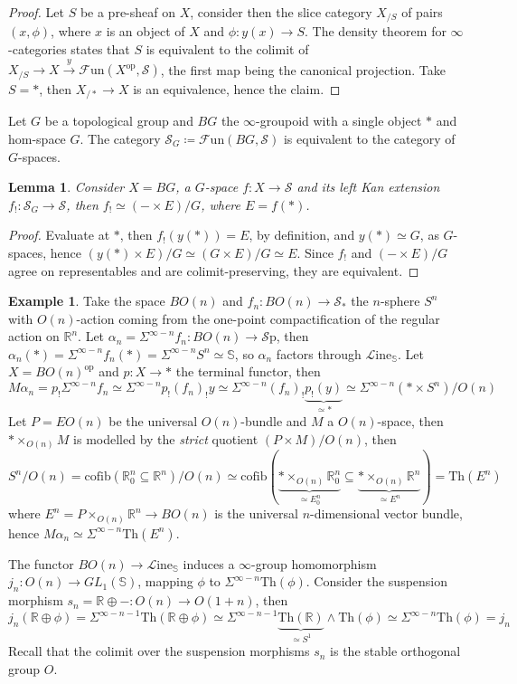 \documentclass[a4paper]{book}
\newcommand{\lF}{\mathcal{F}}
\newcommand{\lL}{\mathcal{L}}
\newcommand{\bR}{\mathbb{R}}
\newcommand{\lS}{\mathcal{S}}
\newcommand{\bS}{\mathbb{S}}
\newcommand{\op}{\mathrm{op}}
\newcommand{\Fun}{\lF\mathrm{un}} %
\newcommand{\Sp}{\lS\mathrm{p}} %
\renewcommand{\Line}{\lL\mathrm{ine}} %
\newtheorem{lemma}[equation]{Lemma}
\theoremstyle{definition}
\newtheorem{example}[equation]{Example}
\theoremstyle{remark}
\numberwithin{equation}{section}
\begin{document}
\begin{proof}
	Let $S$ be a pre-sheaf on $X$, consider then the slice category $X_{/S}$ of pairs $(x,\phi)$, where $x$ is an object of $X$ and $\phi:y(x)\to S$. The density theorem for $\infty$-categories states that $S$ is equivalent to the colimit of $X_{/S}\to X\xrightarrow{y}\Fun(X^{\op},\lS)$, the first map being the canonical projection. Take $S=*$, then $X_{/*}\to X$ is an equivalence, hence the claim. 
\end{proof}
Let $G$ be a topological group and $BG$ the $\infty$-groupoid with a single object $*$ and hom-space $G$. The category $\lS_G\coloneqq\Fun(BG,\lS)$ is equivalent to the category of $G$-spaces.
\begin{lemma}
	Consider $X=BG$, a $G$-space $f:X\to\lS$ and its left Kan extension $f_!:\lS_G\to\lS$, then $f_!\simeq(-\times E)/G$, where $E=f(*)$. 
\end{lemma}
\begin{proof}
	Evaluate at $*$, then $f_!(y(*))=E$, by definition, and $y(*)\simeq G$, as $G$-spaces, hence $(y(*)\times E)/G\simeq(G\times E)/G\simeq E$. Since $f_!$ and $(-\times E)/G$ agree on representables and are colimit-preserving, they are equivalent. 
\end{proof}
\begin{example}\label{ex:bundle}Take the space $BO(n)$ and $f_n:BO(n)\to\lS_*$ the $n$-sphere $S^n$ with $O(n)$-action coming from the one-point compactification of the regular action on $\bR^n$. Let $\alpha_n=\Sigma^{\infty-n}f_n:BO(n)\to\Sp$, then $\alpha_n(*)=\Sigma^{\infty-n}f_n(*)=\Sigma^{\infty-n}S^n\simeq\bS$, so $\alpha_n$ factors through $\Line_\bS$. Let $X=BO(n)^{\op}$ and $p:X\to*$ the terminal functor, then \[M\alpha_n=p_!\Sigma^{\infty-n}f_n\simeq\Sigma^{\infty-n}p_!(f_n)_!y\simeq\Sigma^{\infty-n}(f_n)_!\underbrace{p_!(y)}_{\simeq*}\simeq\Sigma^{\infty-n}(*\times S^n)/O(n)\]
Let $P=EO(n)$ be the universal $O(n)$-bundle and $M$ a $O(n)$-space, then $*\times_{O(n)} M$ is modelled by the \emph{strict} quotient $(P\times M)/O(n)$, then \[S^n/O(n)=\mathrm{cofib}(\bR^n_0\subseteq\bR^n)/O(n)\simeq\mathrm{cofib}(\underbrace{*\times_{O(n)}\bR^n_0}_{\simeq E^n_0}\subseteq\underbrace{ *\times_{O(n)}\bR^n}_{\simeq E^n})=\mathrm{Th}(E^n) \]
where $E^n=P\times_{O(n)}\bR^n\to BO(n)$ is the universal $n$-dimensional vector bundle, hence $M\alpha_n\simeq\Sigma^{\infty-n}\mathrm{Th}(E^n)$. 
\end{example}
The functor $BO(n)\to\Line_\bS$ induces a $\infty$-group homomorphism $j_n:O(n)\to GL_1(\bS)$, mapping $\phi$ to $\Sigma^{\infty-n}\mathrm{Th}(\phi)$. Consider the suspension morphism $s_n=\bR\oplus-:O(n)\to O(1+n)$, then $$j_n(\bR\oplus\phi)=\Sigma^{\infty-n-1}\mathrm{Th}(\bR\oplus\phi)\simeq\Sigma^{\infty-n-1}\underbrace{\mathrm{Th}(\bR)}_{\simeq S^1}\wedge\mathrm{Th}(\phi)\simeq\Sigma^{\infty-n}\mathrm{Th}(\phi)=j_n$$Recall that the colimit over the suspension morphisms $s_n$ is the stable orthogonal group $O$.
\end{document}
